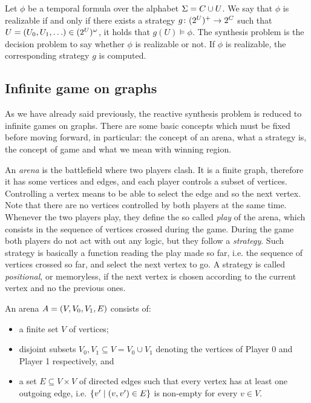 \begin{definition}
Let $\phi$ be a temporal formula over the alphabet $\Sigma = C \cup U$. We say that $\phi$ is realizable if and only if there exists a strategy $g \colon (2^U)^+ \to 2^C$ such that $U = \tuple{U_0,U_1,\dots} \in (2^\U)^\omega$, it holds that $g(U) \models \phi$. 
The synthesis problem is the decision problem to say whether $\phi$ is realizable or not. If $\phi$ is realizable, the corresponding strategy $g$ is computed.
\end{definition}

\subsection{Infinite game on graphs}
As we have already said previously, the reactive synthesis problem is reduced to infinite games on graphs.
There are some basic concepts which must be fixed before moving forward, in particular: the concept of an arena, what a strategy is, the concept of game and what we mean with winning region.

An \textit{arena} is the battlefield where two players clash. It is a finite graph, therefore it has some vertices and edges, and each player controls a subset of vertices. Controlling a vertex means to be able to select the edge and so the next vertex.   
Note that there are no vertices controlled by both players at the same time.
Whenever the two players play, they define the so called \textit{play} of the arena, which consists in the sequence of vertices crossed during the game. 
During the game both players do not act with out any logic, but they follow a \textit{strategy}. Such strategy is basically a function reading the play made so far, i.e. the sequence of vertices crossed so far, and select the next vertex to go. 
A strategy is called \textit{positional}, or memoryless, if the next vertex is chosen according to the current vertex and no the previous ones. 

\begin{definition}
An arena $A = (V, V_0, V_1, E)$ consists of:
\begin{itemize}
    \item a finite set $V$ of vertices;
    \item disjoint subsets $V_0,V_1 \subseteq V = V_0 \cup V_1$ denoting the vertices of Player 0 and Player 1 respectively, and
    \item a set $E \subseteq V \times V$ of directed edges such that every vertex has at least one outgoing edge, i.e. $\{ v' \; | \; (v,v') \in E \}$ is non-empty for every $v \in V$.
\end{itemize}
\end{definition}

